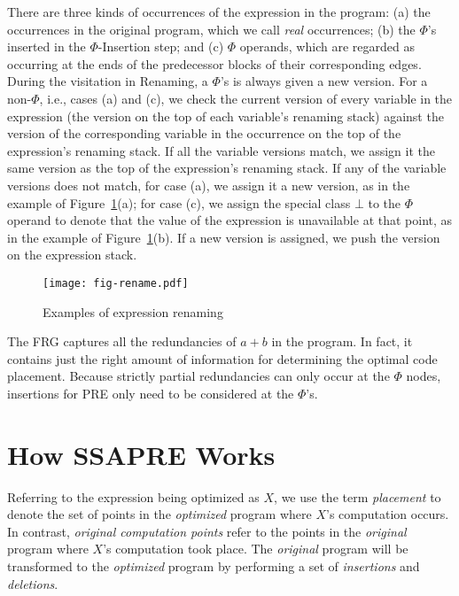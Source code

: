 There are three kinds of occurrences of the expression in the program:
(a) the occurrences in the original program, which we call \emph{real}
occurrences; (b) the $\Phi$'s inserted in the $\Phi$-Insertion step; and
(c) $\Phi$ operands, which are regarded as occurring at the ends of the
predecessor blocks of their corresponding edges.  During the visitation in 
Renaming, a $\Phi$'s is always given a new version.  For a non-$\Phi$, i.e.,
cases (a) and (c),
we check the current version of every variable in the expression (the
version on the top of each variable's renaming stack) against the version of
the corresponding variable in the occurrence on the top of the expression's
renaming stack.  If all the variable versions match, we assign it the same
version as the top of the expression's renaming stack.  If any of the 
variable versions does not match, for case (a), we assign it a new version, as
in the example of Figure~\ref{fig:rename}(a); for case (c),
we assign the special class $\bot$ to the $\Phi$ operand to denote that
the value of the expression is unavailable at that point, as in the example
of Figure~\ref{fig:rename}(b).  If a new version is assigned, we push
the version on the expression stack.

\begin{figure}
\centering
\texttt{[image: fig-rename.pdf]}
\caption{Examples of expression renaming}
\label{fig:rename}
\end{figure}
  
The FRG captures all the redundancies of $a+b$ in the program.  
In fact, it contains just the right
amount of information for determining the optimal code placement.  Because
strictly partial redundancies can only occur at the $\Phi$ nodes,
insertions for PRE only need to be considered at the $\Phi$'s.

\section{How SSAPRE Works}
\label{section:Part3:Pre_not_helped:SSAPRE}

Referring to the expression being optimized as $X$,
we use the term \emph{placement} to denote the set of points in the 
\emph{optimized} program where $X$'s computation occurs. In contrast,
\emph{original computation points} refer to the points in the \emph{original} 
program where $X$'s computation took place.  The \emph{original} program will be
transformed to the \emph{optimized} program by performing a set of
\emph{insertions} and \emph{deletions}.  

